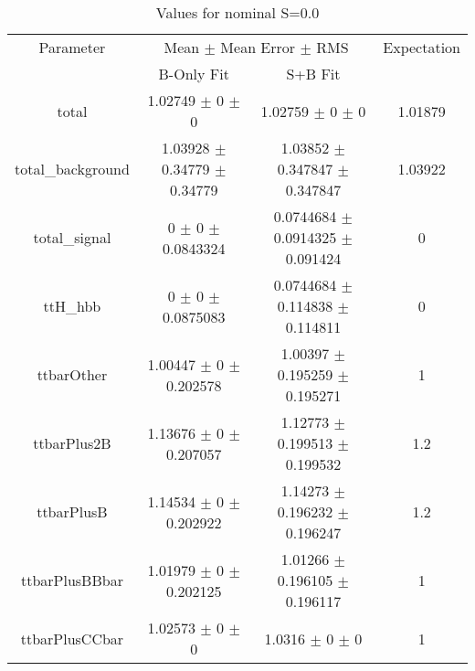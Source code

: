 \begin{table}
\centering
\caption{Values for nominal S=0.0}
\begin{tabular}{cccc}
\toprule
Parameter & \multicolumn{2}{c}{Mean $\pm$ Mean Error $\pm$ RMS} & Expectation\\
 & B-Only Fit & S+B Fit & \\
\midrule
total & \num{1.02749} $\pm$ \num{0} $\pm$ \num{0} & \num{1.02759} $\pm$ \num{0} $\pm$ \num{0} & \num{1.01879}\\
total\_background & \num{1.03928} $\pm$ \num{0.34779} $\pm$ \num{0.34779} & \num{1.03852} $\pm$ \num{0.347847} $\pm$ \num{0.347847} & \num{1.03922}\\
total\_signal & \num{0} $\pm$ \num{0} $\pm$ \num{0.0843324} & \num{0.0744684} $\pm$ \num{0.0914325} $\pm$ \num{0.091424} & \num{0}\\
ttH\_hbb & \num{0} $\pm$ \num{0} $\pm$ \num{0.0875083} & \num{0.0744684} $\pm$ \num{0.114838} $\pm$ \num{0.114811} & \num{0}\\
ttbarOther & \num{1.00447} $\pm$ \num{0} $\pm$ \num{0.202578} & \num{1.00397} $\pm$ \num{0.195259} $\pm$ \num{0.195271} & \num{1}\\
ttbarPlus2B & \num{1.13676} $\pm$ \num{0} $\pm$ \num{0.207057} & \num{1.12773} $\pm$ \num{0.199513} $\pm$ \num{0.199532} & \num{1.2}\\
ttbarPlusB & \num{1.14534} $\pm$ \num{0} $\pm$ \num{0.202922} & \num{1.14273} $\pm$ \num{0.196232} $\pm$ \num{0.196247} & \num{1.2}\\
ttbarPlusBBbar & \num{1.01979} $\pm$ \num{0} $\pm$ \num{0.202125} & \num{1.01266} $\pm$ \num{0.196105} $\pm$ \num{0.196117} & \num{1}\\
ttbarPlusCCbar & \num{1.02573} $\pm$ \num{0} $\pm$ \num{0} & \num{1.0316} $\pm$ \num{0} $\pm$ \num{0} & \num{1}\\
\bottomrule
\end{tabular}
\end{table}